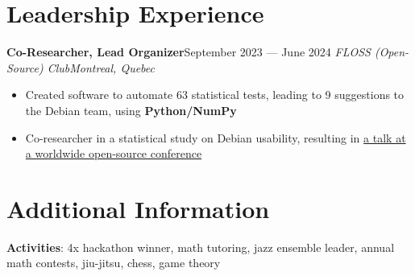 \documentclass{article}
\newcommand{\newrole}[4]{
    {\normalfont\textbf{#1}\hfill#3}
    \newline
    \textit{#2}\hfill\textit{#4}
}
\newenvironment{bulletpoints}{\begin{itemize}\setlength\itemsep{-0.2em}}{\end{itemize}}
\begin{document}
\section*{Leadership Experience}
\newrole{Co-Researcher, Lead Organizer}{FLOSS (Open-Source) Club}{September 2023 --- June 2024}{Montreal, Quebec}
\begin{bulletpoints}
    \item Created software to automate 63 statistical tests, leading to 9 suggestions to the Debian team, using \textbf{Python/NumPy}
    \item Co-researcher in a statistical study on Debian usability, resulting in \href{https://debconf24.debconf.org/talks/49-debian-installer-usability-tests-take-2/}{a talk at a worldwide open-source conference\;\faExternalLink}
\end{bulletpoints}


\section*{Additional Information}
{\bfseries Activities}: 4x hackathon winner, math tutoring, jazz ensemble leader, annual math contests, jiu-jitsu, chess, game theory
\end{document}
